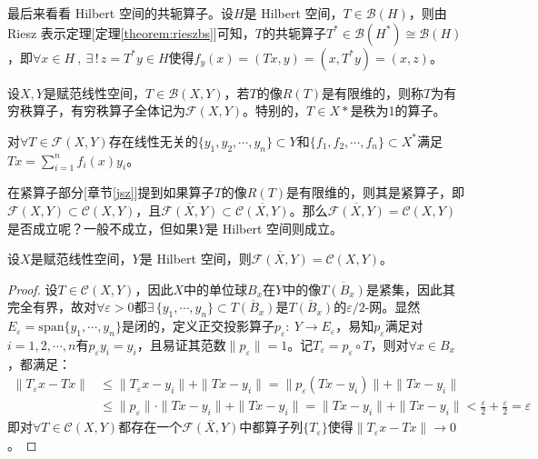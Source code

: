 最后来看看 Hilbert 空间的共轭算子。设$H$是 Hilbert 空间，$T \in \mathscr{B}(H)$，则由 Riesz 表示定理[定理\ref{theorem:rieszbs}]可知，$T$的共轭算子$T^*\in\mathscr{B}(H^*) \cong \mathscr{B}(H)$，即$\forall x \in H \ , \ \exists \, ! \, z=T^*y \in H$使得$f_y(x)=(Tx,y)=(x,T^*y)=(x,z)$。

\begin{definition}[有穷秩算子]
设$X,Y$是赋范线性空间，$T\in\mathscr{B}(X,Y)$，若$T$的像$R(T)$是有限维的，则称$T$为有穷秩算子，有穷秩算子全体记为$\mathscr{F}(X,Y)$。特别的，$T \in X*$是秩为1的算子。
\end{definition}
\begin{theorem}
对$\forall T \in \mathscr{F}(X,Y)$存在线性无关的$\{y_1,y_2,\cdots,y_n\} \subset Y$和$\{f_1,f_2,\cdots,f_n\} \subset X^*$满足$Tx=\sum_{i=1}^n f_i(x)y_i$。
\end{theorem}
在紧算子部分[章节\ref{jsz}]提到如果算子$T$的像$R(T)$是有限维的，则其是紧算子，即$\mathscr{F}(X,Y) \subset \mathscr{C}(X,Y)$，且$\overline{\mathscr{F}(X,Y)} \subset \overline{\mathscr{C}(X,Y)}$。那么$\overline{\mathscr{F}(X,Y)}=\mathscr{C}(X,Y)$是否成立呢？一般不成立，但如果$Y$是 Hilbert 空间则成立。
\begin{theorem}\label{theorem:yqzj}
设$X$是赋范线性空间，$Y$是 Hilbert 空间，则$\overline{\mathscr{F}(X,Y)}=\mathscr{C}(X,Y)$。
\end{theorem}
\begin{proof}
设$T \in \mathscr{C}(X,Y)$，因此$X$中的单位球$B_x$在$Y$中的像$\overline{T(B_x)}$是紧集，因此其完全有界，故对$\forall \varepsilon>0$都$\exists \, \{y_1,\cdots,y_n\} \subset \overline{T(B_x)}$是$\overline{T(B_x)}$的$\varepsilon/2$-网。显然$E_{\varepsilon}=\text{span}\{y_1,\cdots,y_n\}$是闭的，定义正交投影算子$p_{\varepsilon}: \ Y \to E_{\varepsilon}$，易知$p_{\varepsilon}$满足对$i=1,2,\cdots,n$有$p_{\varepsilon}y_i=y_i$，且易证其范数$\|p_{\varepsilon}\|=1$。记$T_{\varepsilon}=p_{\varepsilon} \circ T$，则对$\forall x \in B_x$，都满足：
\[\begin{aligned}
\|T_{\varepsilon}x-Tx\| & \leq \|T_{\varepsilon}x-y_i\|+\|Tx-y_i\|=\|p_{\varepsilon}(Tx-y_i)\|+\|Tx-y_i\|\\
& \leq \|p_{\varepsilon}\|\cdot\|Tx-y_i\|+\|Tx-y_i\|=\|Tx-y_i\|+\|Tx-y_i\|<\frac{\varepsilon}{2}+\frac{\varepsilon}{2}=\varepsilon
\end{aligned}\]
即对$\forall T \in \mathscr{C}(X,Y)$都存在一个$\overline{\mathscr{F}(X,Y)}$中都算子列$\{T_{\varepsilon}\}$使得$\|T_{\varepsilon}x-Tx\| \to 0$。
\end{proof}